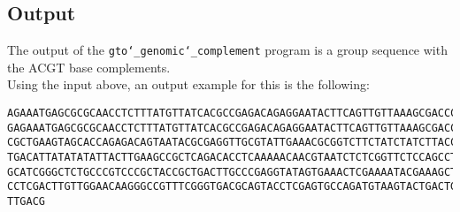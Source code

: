 \subsection*{Output}
The output of the \texttt{gto\char`_genomic\char`_complement} program is a group sequence with the ACGT base complements.\\
Using the input above, an output example for this is the following:
\begin{lstlisting}
AGAAATGAGCGCGCAACCTCTTTATGTTATCACGCCGAGACAGAGGAATACTTCAGTTGTTAAAGCGACCCTGAACGCC
GAGAAATGAGCGCGCAACCTCTTTATGTTATCACGCCGAGACAGAGGAATACTTCAGTTGTTAAAGCGACCCTGAACGC
CGCTGAAGTAGCACCAGAGACAGTAATACGCGAGGTTGCGTATTGAAACGCGGTCTTCTATCTATCTTACCACATTCTT
TGACATTATATATATTACTTGAAGCCGCTCAGACACCTCAAAAACAACGTAATCTCTCGGTTCTCCAGCCTGCAGGAGT
GCATCGGGCTCTGCCCGTCCCGCTACCGCTGACTTGCCCGAGGTATAGTGAAACTCGAAAATACGAAAGCTGAGGAGGT
CCTCGACTTGTTGGAACAAGGGCCGTTTCGGGTGACGCAGTACCTCGAGTGCCAGATGTAAGTACTGACTGATTGGCAT
TTGACG
\end{lstlisting}